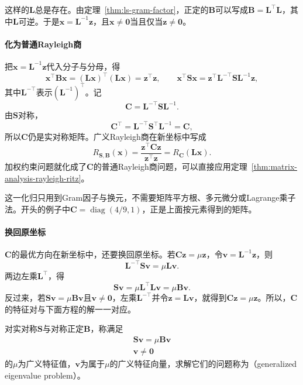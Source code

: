 这样的$\bm L$总是存在。由定理~\ref{thm:ls-gram-factor}，正定的$\bm B$可以写成$\bm B=\bm L^\top\bm L$，其中$\bm L$可逆。于是$\bm x=\bm L^{-1}\bm z$，且$\bm x\neq\bm0$当且仅当$\bm z\neq\bm0$。

\paragraph{化为普通Rayleigh商}
把$\bm x=\bm L^{-1}\bm z$代入分子与分母，得
\[
 \bm x^\top\bm B\bm x=(\bm L\bm x)^\top(\bm L\bm x)=\bm z^\top\bm z,\qquad
 \bm x^\top\bm S\bm x=\bm z^\top\bm L^{-\top}\bm S\bm L^{-1}\bm z ,
\]
其中$\bm L^{-\top}$表示$(\bm L^{-1})^\top$。记
\begin{equation}
 \bm C=\bm L^{-\top}\bm S\bm L^{-1}.
 \label{eq:ls-generalized-rayleigh-reduced-matrix}
\end{equation}
由$\bm S$对称，
\[
 \bm C^\top=\bm L^{-\top}\bm S^\top\bm L^{-1}=\bm C ,
\]
所以$\bm C$仍是实对称矩阵。广义Rayleigh商在新坐标中写成
\begin{equation}
 R_{\bm S,\bm B}(\bm x)=\frac{\bm z^\top\bm C\bm z}{\bm z^\top\bm z}=R_{\bm C}(\bm L\bm x).
 \label{eq:ls-generalized-rayleigh-reduction}
\end{equation}
加权约束问题就化成了$\bm C$的普通Rayleigh商问题，可以直接应用定理~\ref{thm:matrix-analysis-rayleigh-ritz}。

这一化归只用到Gram因子与换元，不需要矩阵平方根、多元微分或Lagrange乘子法。开头的例子中$\bm C=\operatorname{diag}(4/9,1)$，正是上面按元素得到的矩阵。

\paragraph{换回原坐标}
$\bm C$的最优方向在新坐标中，还要换回原坐标。若$\bm C\bm z=\mu\bm z$，令$\bm v=\bm L^{-1}\bm z$，则
\[
 \bm L^{-\top}\bm S\bm v=\mu\bm L\bm v .
\]
两边左乘$\bm L^\top$，得
\[
 \bm S\bm v=\mu\bm L^\top\bm L\bm v=\mu\bm B\bm v .
\]
反过来，若$\bm S\bm v=\mu\bm B\bm v$且$\bm v\neq\bm0$，左乘$\bm L^{-\top}$并令$\bm z=\bm L\bm v$，就得到$\bm C\bm z=\mu\bm z$。所以，$\bm C$的特征对与下面方程的解一一对应。

\begin{definition}[广义特征值]
\label{def:matrix-analysis-generalized-eigenvalue}
对实对称$\bm S$与对称正定$\bm B$，称满足
\begin{equation}
\begin{gathered}
\bm S\bm v=\mu\bm B\bm v\\
\bm v\neq\bm0
\end{gathered}
\label{eq:matrix-analysis-generalized-eigenproblem}
\end{equation}
的$\mu$为广义特征值，$\bm v$为属于$\mu$的广义特征向量，求解它们的问题称为（generalized eigenvalue problem）。
\end{definition}

